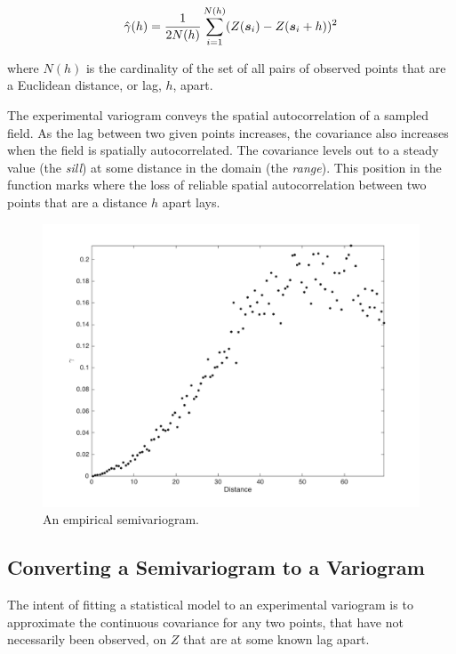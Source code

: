 \begin{equation}
    \label{eq:goovexpvar}
    \hat{\gamma}(h) = \frac{1}{2N(h)}\sum_{i=1}^{N(h)} (Z({\it{\boldsymbol{s}}}_i) - Z({\it{\boldsymbol{s}}}_i+h))^2
\end{equation}

\noindent where $N(h)$ is the cardinality of the set of all pairs of observed points that are a Euclidean distance, or lag, $h$, apart.

The experimental variogram conveys the spatial autocorrelation of a sampled field. As the lag between two given points increases, the covariance also increases when the field is spatially autocorrelated. The covariance levels out to a steady value (the \textit{sill}) at some distance in the domain (the \textit{range}). This position in the function marks where the loss of reliable spatial autocorrelation between two points that are a distance $h$ apart lays.

\begin{figure}[ht!]
    \centering    
    \includegraphics[width=0.8\linewidth]{figures/exp_variogram.png}
    \ssp
    \caption{An empirical semivariogram.}
    \label{fig:emp_semiv}
\end{figure}

\subsection{Converting a Semivariogram to a Variogram} \label{sec:semitovar}
The intent of fitting a statistical model to an experimental variogram is to approximate the continuous covariance for any two points, that have not necessarily been observed, on $Z$ that are at some known lag apart.

